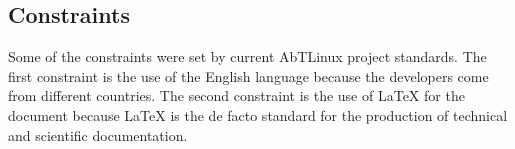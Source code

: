\subsection{Constraints}
Some of the constraints were set by current AbTLinux project standards. The first constraint is the use of the English language because the developers come from different countries. The second constraint is the use of LaTeX for the document because LaTeX is the de facto standard for the production of technical and scientific documentation.
